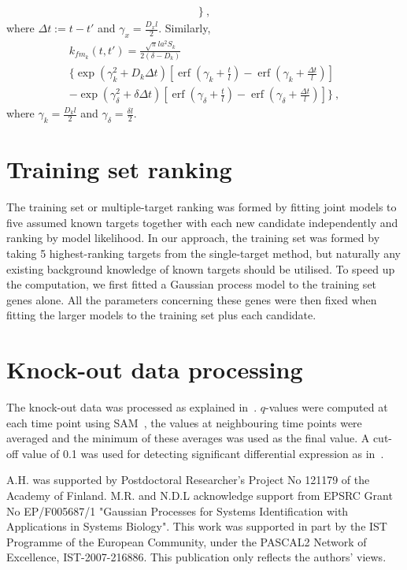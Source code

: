 \documentclass{pnastwo}
\newcommand{\erf}{\operatorname{erf}}
\begin{document}
\begin{article}
\begin{materials}
\begin{multline*}
    \bigg\}\ ,
  \end{multline*}
  where $\Delta t := t - t'$ and $\gamma_x = \frac{D_x l}{2}$.
  Similarly, 
  \begin{multline*}
    k_{f m_k}(t, t')
    = \frac{\sqrt{\pi} l a^2 S_k}{2(\delta - D_k)} \\
    \bigg\{
    \exp\left(\gamma_k^2 + D_k \Delta t \right)
    \left[\erf\left(\gamma_k + \frac{t}{l}\right) - \erf\left(\gamma_k + \frac{\Delta t}{l}\right)\right] \\
    -
    \exp\left(\gamma_\delta^2 + \delta \Delta t\right)
    \left[\erf\left(\gamma_\delta + \frac{t}{l}\right) - \erf\left(\gamma_\delta + \frac{\Delta t}{l}\right)\right]
    \bigg\}\ ,
  \end{multline*}
  where $\gamma_k = \frac{D_k l}{2}$ and $\gamma_\delta = \frac{\delta l}{2}$.

  \section{Training set ranking}
  The training set or multiple-target ranking was formed by fitting
  joint models to five assumed known targets together with each new
  candidate independently and ranking by model likelihood.  In our
  approach, the training set was formed by taking 5 highest-ranking
  targets from the single-target method, but naturally any existing background
  knowledge of known targets should be utilised.  To speed up the
  computation, we first fitted a Gaussian process model to the
  training set genes alone.  All the parameters concerning these genes
  were then fixed when fitting the larger models to the training set
  plus each candidate.

  \section{Knock-out data processing}
  The knock-out data was processed as explained
  in~\cite{Sandmann2006a}.  $q$-values were computed at each time
  point using SAM~\cite{Saeed2003,Tusher2001}, the values at
  neighbouring time points were averaged and the minimum of these
  averages was used as the final value.  A cut-off value of 0.1 was
  used for detecting significant differential expression as
  in~\cite{Sandmann2006a}.

\end{materials}

\begin{acknowledgments}
A.H. was supported by Postdoctoral Researcher's Project No 121179 of the Academy of Finland.
M.R. and N.D.L acknowledge support from EPSRC Grant No EP/F005687/1 "Gaussian Processes for Systems Identification with Applications in Systems Biology". 
This work was supported in part by the IST Programme of the European Community, under the PASCAL2 Network of Excellence, IST-2007-216886. This publication only reflects the authors' views.
\end{acknowledgments}


\end{article}
\end{document}
